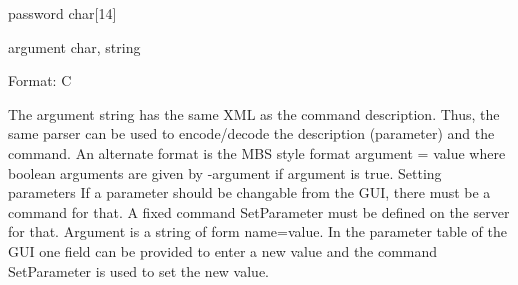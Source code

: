 \begin{compactdesc}
\item[password]   char[14]
\item[argument]   char,  string
\item[Format:] C
\end{compactdesc}

The argument string has the same XML as the command description. Thus, the same parser can be used to encode/decode the description (parameter) and the command. An alternate format is the MBS style format argument = value where boolean arguments are given by -argument if argument is true.
Setting parameters
If a parameter should be changable from the GUI, there must be a command for that. A fixed command SetParameter must be defined on the server for that. Argument is a string of form name=value. In the parameter table of the GUI one field can be provided to enter a new value and the command SetParameter is used to set the new value.

